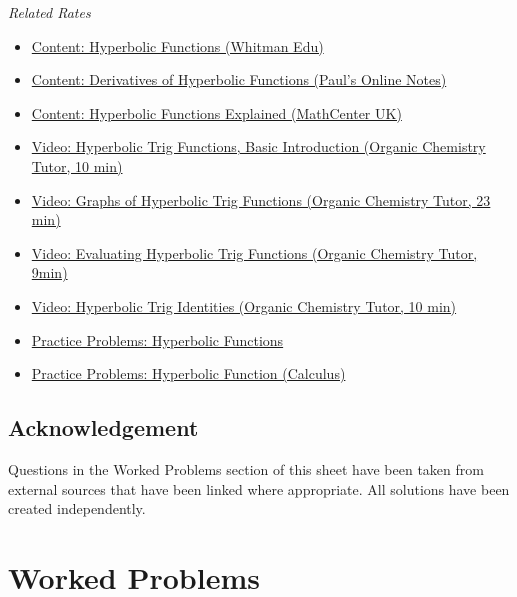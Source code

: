 \documentclass{article}
\begin{document}
\noindent\textit{Related Rates}
\begin{itemize}
    \item \href{https://www.whitman.edu/mathematics/calculus_online/section04.11.html}{Content: Hyperbolic Functions (Whitman Edu)} 
    \item \href{https://tutorial.math.lamar.edu/classes/calci/DiffHyperFcns.aspx}{Content: Derivatives of Hyperbolic Functions (Paul's Online Notes)}
    \item \href{https://www.mathcentre.ac.uk/resources/workbooks/mathcentre/hyperbolicfunctions.pdf}{Content: Hyperbolic Functions Explained (MathCenter UK)}
    \item \href{https://youtu.be/PJRSu0Vf0r0}{Video: Hyperbolic Trig Functions, Basic Introduction (Organic Chemistry Tutor, 10 min)}
    \item \href{https://youtu.be/w_UEjfADQQc}{Video: Graphs of Hyperbolic Trig Functions (Organic Chemistry Tutor, 23 min)}
    \item \href{https://youtu.be/va09U91xHxA}{Video: Evaluating Hyperbolic Trig Functions (Organic Chemistry Tutor, 9min)}
    \item \href{https://youtu.be/m9nwdn55Z2w}{Video: Hyperbolic Trig Identities (Organic Chemistry Tutor, 10 min)}
    \item \href{https://www.cimt.org.uk/projects/mepres/alevel/fpure_ch2.pdf}{Practice Problems: Hyperbolic Functions}
    \item \href{https://s3.amazonaws.com/calculus-worksheets/calculus-2-tutor/Calculus+2+Tutor+-+Worksheet+3+-+Hyperbolic+Functions.pdf}{Practice Problems: Hyperbolic Function (Calculus)}
\end{itemize}

\subsection*{Acknowledgement}
Questions in the Worked Problems section of this sheet have been taken from external sources that have been linked where appropriate. All solutions have been created independently.

\pagebreak
\section*{Worked Problems}
\label{WorkedProblems}
\end{document}
